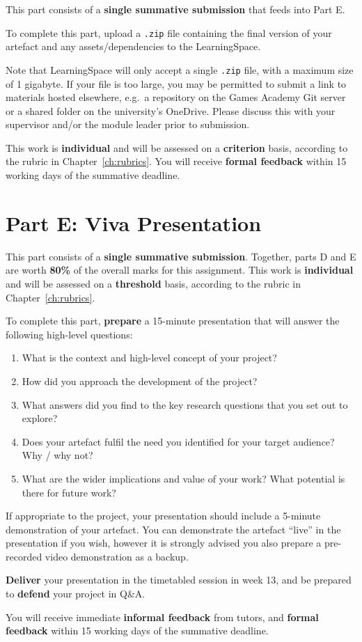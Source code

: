 This part consists of a \textbf{single summative submission} that feeds into Part E.

To complete this part, upload a \texttt{.zip} file containing the final version of your artefact and any assets/dependencies to the LearningSpace.

Note that LearningSpace will only accept a single \texttt{.zip} file, with a maximum size of 1 gigabyte.
If your file is too large, you may be permitted to submit a link to materials hosted elsewhere,
e.g.\ a repository on the Games Academy Git server or a shared folder on the university's OneDrive.
Please discuss this with your supervisor and/or the module leader prior to submission.

This work is \textbf{individual} and will be assessed on a \textbf{criterion} basis, according to the rubric in Chapter~\ref{ch:rubrics}. You will receive \textbf{formal feedback} within 15 working days of the summative deadline.

\section*{Part E: Viva Presentation}

This part consists of a \textbf{single summative submission}. Together, parts D and E are worth \textbf{80\%} of the overall marks for this assignment.
This work is \textbf{individual} and will be assessed on a \textbf{threshold} basis, according to the rubric in Chapter~\ref{ch:rubrics}.

To complete this part, \textbf{prepare} a 15-minute presentation that will answer the following high-level questions:
\begin{enumerate}[label=(\roman*)]
	\item What is the context and high-level concept of your project?
	\item How did you approach the development of the project?
	\item What answers did you find to the key research questions that you set out to explore?
	\item Does your artefact fulfil the need you identified for your target audience? Why / why not?
	\item What are the wider implications and value of your work? What potential is there for future work?
\end{enumerate}

If appropriate to the project, your presentation should include a 5-minute demonstration of your artefact.
You can demonstrate the artefact ``live'' in the presentation if you wish, however it is strongly advised you also prepare a pre-recorded video demonstration as a backup.

\textbf{Deliver} your presentation in the timetabled session in week 13, and be prepared to \textbf{defend} your project in Q\&A.

You will receive immediate \textbf{informal feedback} from tutors, and \textbf{formal feedback} within 15 working days of the summative deadline.
